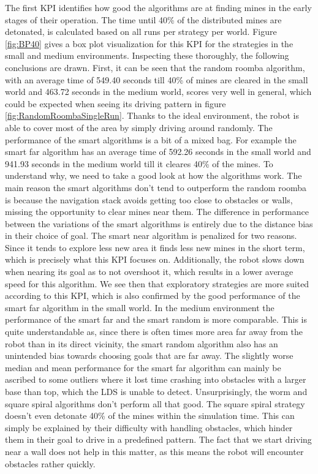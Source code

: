 \documentclass[conference]{IEEEtran}
\begin{document}
The first KPI identifies how good the algorithms are at finding mines in the early stages of their operation. The time until 40\% of the distributed mines are detonated, is calculated based on all runs per strategy per world. Figure \ref{fig:BP40} gives a box plot visualization for this KPI for the strategies in the small and medium environments. Inspecting these thoroughly, the following conclusions are drawn. First, it can be seen that the random roomba algorithm, with an average time of 549.40 seconds till 40\% of mines are cleared in the small world and 463.72 seconds in the medium world, scores very well in general, which could be expected when seeing its driving pattern in figure \ref{fig:RandomRoombaSingleRun}. Thanks to the ideal environment, the robot is able to cover most of the area by simply driving around randomly. The performance of the smart algorithms is a bit of a mixed bag. For example the smart far algorithm has an average time of 592.26 seconds in the small world and 941.93 seconds in the medium world till it cleares 40\% of the mines. To understand why, we need to take a good look at how the algorithms work. The main reason the smart algorithms don't tend to outperform the random roomba is because the navigation stack avoids getting too close to obstacles or walls, missing the opportunity to clear mines near them. The difference in performance between the variations of the smart algorithms is entirely due to the distance bias in their choice of goal. The smart near algorithm is penalized for two reasons. Since it tends to explore less new area it finds less new mines in the short term, which is precisely what this KPI focuses on. Additionally, the robot slows down when nearing its goal as to not overshoot it, which results in a lower average speed for this algorithm. We see then that exploratory strategies are more suited according to this KPI, which is also confirmed by the good performance of the smart far algorithm in the small world. In the medium environment the performance of the smart far and the smart random is more comparable. This is quite understandable as, since there is often times more area far away from the robot than in its direct vicinity, the smart random algorithm also has an unintended bias towards choosing goals that are far away. The slightly worse median and mean performance for the smart far algorithm can mainly be ascribed to some outliers where it lost time crashing into obstacles with a larger base than top, which the LDS is unable to detect. Unsurprisingly, the worm and square spiral algorithms don't perform all that good. The square spiral strategy doesn't even detonate 40\% of the mines within the simulation time. This can simply be explained by their difficulty with handling obstacles, which hinder them in their goal to drive in a predefined pattern. The fact that we start driving near a wall does not help in this matter, as this means the robot will encounter obstacles rather quickly.\\
\end{document}
